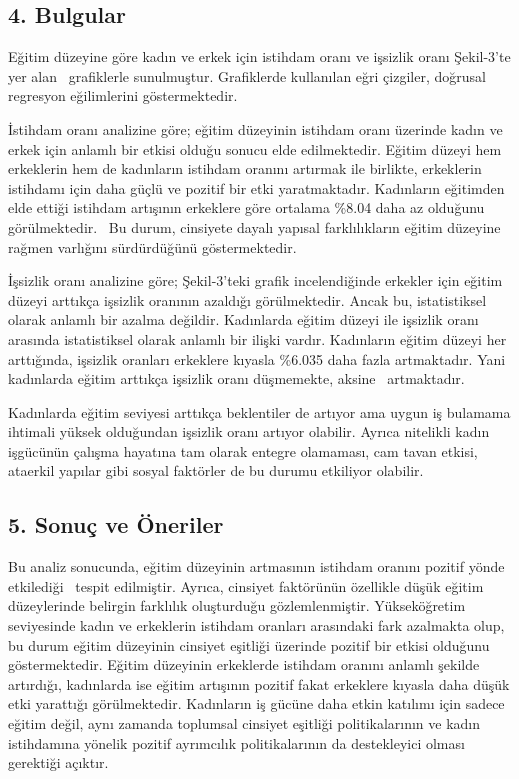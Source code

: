 \documentclass[
  11pt,
  a4paper,
  DIV=11,
  numbers=noendperiod]{scrartcl}
\begin{document}
\subsection{4. Bulgular}\label{bulgular}

Eğitim düzeyine göre kadın ve erkek için istihdam oranı ve işsizlik
oranı Şekil-3'te yer alan~ grafiklerle sunulmuştur. Grafiklerde
kullanılan eğri çizgiler, doğrusal regresyon eğilimlerini
göstermektedir.

İstihdam oranı analizine göre; eğitim düzeyinin istihdam oranı üzerinde
kadın ve erkek için anlamlı bir etkisi olduğu sonucu elde edilmektedir.
Eğitim düzeyi hem erkeklerin hem de kadınların istihdam oranını artırmak
ile birlikte, erkeklerin istihdamı için daha güçlü ve pozitif bir etki
yaratmaktadır. Kadınların eğitimden elde ettiği istihdam artışının
erkeklere göre ortalama \%8.04 daha az olduğunu görülmektedir.~ Bu
durum, cinsiyete dayalı yapısal farklılıkların eğitim düzeyine rağmen
varlığını sürdürdüğünü göstermektedir.

İşsizlik oranı analizine göre; Şekil-3'teki grafik incelendiğinde
erkekler için eğitim düzeyi arttıkça işsizlik oranının azaldığı
görülmektedir. Ancak bu, istatistiksel olarak anlamlı bir azalma
değildir. Kadınlarda eğitim düzeyi ile işsizlik oranı arasında
istatistiksel olarak anlamlı bir ilişki vardır. Kadınların eğitim düzeyi
her arttığında, işsizlik oranları erkeklere kıyasla \%6.035 daha fazla
artmaktadır. Yani kadınlarda eğitim arttıkça işsizlik oranı düşmemekte,
aksine~ artmaktadır.

Kadınlarda eğitim seviyesi arttıkça beklentiler de artıyor ama uygun iş
bulamama ihtimali yüksek olduğundan işsizlik oranı artıyor olabilir.
Ayrıca nitelikli kadın işgücünün çalışma hayatına tam olarak entegre
olamaması, cam tavan etkisi, ataerkil yapılar gibi sosyal faktörler de
bu durumu etkiliyor olabilir.

\subsection{5. Sonuç ve Öneriler}\label{sonuuxe7-ve-uxf6neriler}

Bu analiz sonucunda, eğitim düzeyinin artmasının istihdam oranını
pozitif yönde etkilediği~ tespit edilmiştir. Ayrıca, cinsiyet faktörünün
özellikle düşük eğitim düzeylerinde belirgin farklılık oluşturduğu
gözlemlenmiştir. Yükseköğretim seviyesinde kadın ve erkeklerin istihdam
oranları arasındaki fark azalmakta olup, bu durum eğitim düzeyinin
cinsiyet eşitliği üzerinde pozitif bir etkisi olduğunu göstermektedir.
Eğitim düzeyinin erkeklerde istihdam oranını anlamlı şekilde artırdığı,
kadınlarda ise eğitim artışının pozitif fakat erkeklere kıyasla daha
düşük etki yarattığı görülmektedir. Kadınların iş gücüne daha etkin
katılımı için sadece eğitim değil, aynı zamanda toplumsal cinsiyet
eşitliği politikalarının ve kadın istihdamına yönelik pozitif ayrımcılık
politikalarının da destekleyici olması gerektiği açıktır.
\end{document}

